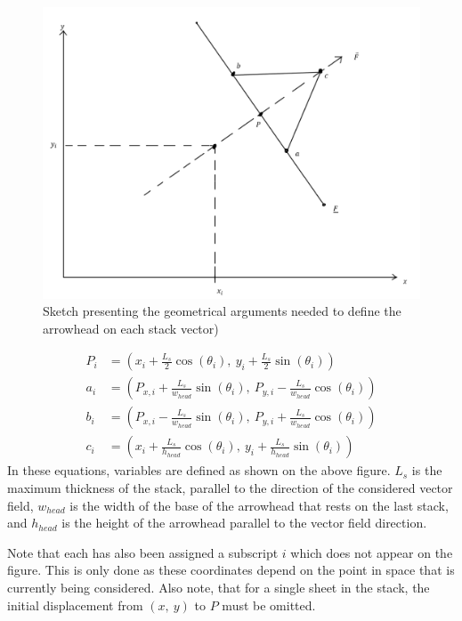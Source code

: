 \documentclass[12pt]{report}
\begin{document}
\begin{figure}[H]
	\centering
	\includegraphics[scale=0.3]{Documentation_images/Geometry of 1 stack sheet, displacement 2}
	\caption{Sketch presenting the geometrical arguments needed to define the arrowhead on each stack vector)}
	\label{fig:arrowhead gometry}
\end{figure}
\begin{align*}
P_i &= \left( x_i + \frac{L_s}{2} \cos( \theta_i) , \  y_i + \frac{L_s}{2} \sin( \theta_i) \right) \\
a_i &= \left( P_{x, i} + \frac{L_s}{w_{head}} \sin( \theta_i) , \  P_{y, i} - \frac{L_s}{w_{head}} \cos( \theta_i) \right)\\
b_i &= \left( P_{x, i} - \frac{L_s}{w_{head}} \sin( \theta_i) , \  P_{y, i} + \frac{L_s}{w_{head}} \cos( \theta_i) \right)\\ 
c_i &= \left( x_i + \frac{L_s}{h_{head}} \cos( \theta_i) , \  y_i + \frac{L_s}{h_{head}} \sin( \theta_i) \right)
\end{align*}
\noindent In these equations, variables are defined as shown on the above figure. \( L_s \) is the maximum thickness of the stack, parallel to the direction of the considered vector field, \( w_{head} \) is the width of the base of the arrowhead that rests on the last stack, and \( h_{head} \) is the height of the arrowhead parallel to the vector field direction.

Note that each has also been assigned a subscript \( i \) which does not appear on the figure. This is only done as these coordinates depend on the point in space that is currently being considered. Also note, that for a single sheet in the stack, the initial displacement from \( (x, \ y )\) to \( P \) must be omitted.
\end{document}
